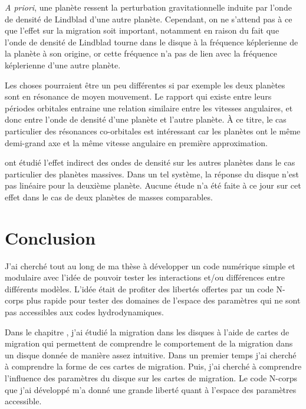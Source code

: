 \emph{A priori}, une planète ressent la perturbation gravitationnelle induite par l'onde de densité de Lindblad d'une autre planète. Cependant, on ne s'attend pas à ce que l'effet sur la migration soit important, notamment en raison du fait que l'onde de densité de Lindblad tourne dans le disque à la fréquence képlerienne de la planète à son origine, or cette fréquence n'a pas de lien avec la fréquence képlerienne d'une autre planète. 

Les choses pourraient être un peu différentes si par exemple les deux planètes sont en résonance de moyen mouvement. Le rapport
qui existe entre leurs périodes orbitales entraine une relation similaire entre les vitesses angulaires, et donc entre l'onde de
densité d'une planète et l'autre planète. À ce titre, le cas particulier des résonances co-orbitales est intéressant car les
planètes ont le même demi-grand axe et la même vitesse angulaire en première approximation.

\cite{podlewska2012outward, baruteau2013disk} ont étudié l'effet indirect des ondes de densité sur les autres planètes dans le cas particulier des planètes massives. Dans un tel système, la réponse du disque n'est pas linéaire pour la deuxième planète. Aucune étude n'a été faite à ce jour sur cet effet dans le cas de deux planètes de masses comparables. 

\section{Conclusion}
J'ai cherché tout au long de ma thèse à développer un code numérique simple et modulaire avec l'idée de pouvoir tester les interactions et/ou différences entre différents modèles. L'idée était de profiter des libertés offertes par un code N-corps plus rapide pour tester des domaines de l'espace des paramètres qui ne sont pas accessibles aux codes hydrodynamiques. 

\bigskip

Dans le chapitre , j'ai étudié la migration dans les disques à l'aide de cartes de migration qui permettent de comprendre le comportement de la migration dans un disque donnée de manière assez intuitive. Dans un premier temps j'ai cherché à comprendre la forme de ces cartes de migration. Puis, j'ai cherché à comprendre l'influence des paramètres du disque sur les cartes de migration. Le code N-corps que j'ai développé m'a donné une grande liberté quant à l'espace des paramètres accessible. 


